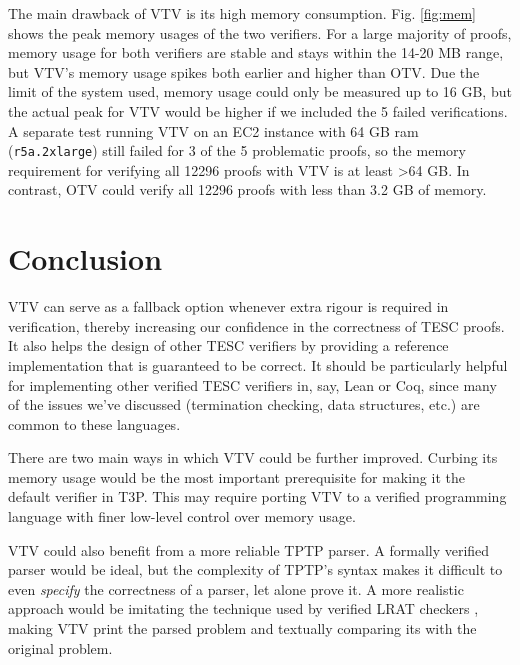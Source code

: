 \documentclass[12pt]{article}
\begin{document}
The main drawback of VTV is its high memory consumption. Fig. \ref{fig:mem} shows
the peak memory usages of the two verifiers. For a large majority of proofs, 
memory usage for both verifiers are stable and stays within the 14-20 MB range,
but VTV's memory usage spikes both earlier and higher than OTV. Due the limit of 
the system used, memory usage could only be measured up to 16 GB, but the actual peak for VTV 
would be higher if we included the 5 failed verifications. A separate test running 
VTV on an EC2 instance with 64 GB ram (\texttt{r5a.2xlarge}) still failed for 3 of 
the 5 problematic proofs, so the memory requirement for verifying all 12296 proofs 
with VTV is at least >64 GB. In contrast, OTV could verify all 
12296 proofs with less than 3.2 GB of memory.



\section{Conclusion}  \label{sec:conclusion}

VTV can serve as a fallback option whenever extra rigour is required in verification, 
thereby increasing our confidence in the correctness of TESC proofs. 
It also helps the design of other TESC verifiers by providing a reference 
implementation that is guaranteed to be correct. It should be particularly helpful 
for implementing other verified TESC verifiers in, say, Lean or Coq, since many 
of the issues we've discussed (termination checking, data structures, etc.) 
are common to these languages. 

There are two main ways in which VTV could be further improved. Curbing its 
memory usage would be the most important prerequisite for making it the 
default verifier in T3P. This may require porting VTV to a verified programming
language with finer low-level control over memory usage. 

VTV could also benefit from a more reliable TPTP parser. A formally verified 
parser would be ideal, but the complexity of TPTP's syntax makes it difficult  
to even \textit{specify} the correctness of a parser, let alone prove it. 
A more realistic approach would be imitating the technique used by verified 
LRAT checkers \cite{heule2017efficient}, making VTV print the parsed problem 
and textually comparing its with the original problem.




\end{document}
